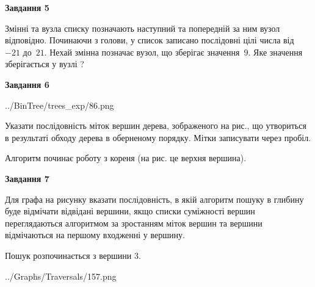 \documentclass[12pt, ukrainian]{article}
\begin{document}
{\begin {large}
{\begin {center}\textbf{Завдання 5}\end {center}}\par
Змінні  та  вузла списку позначають наступний та попередній за ним вузол відповідно. Починаючи з голови, у список записано послідовні цілі числа від~$-21$ до~$21$. Нехай змінна  позначає вузол, що зберігає значення~$9$.
Яке значення зберігається у вузлі  ?\par
\newpage

{\begin {center}\textbf{Завдання 6}\end {center}}\par

\begin{center}
	{../BinTree/trees_exp/86.png}
\end{center}
Указати послідовність міток вершин дерева, зображеного на рис., що утвориться в результаті обходу дерева в оберненому порядку. Мітки записувати через пробіл.\par Алгоритм починає роботу з кореня (на рис. це верхня вершина).\par
\newpage

{\begin {center}\textbf{Завдання 7}\end {center}}\par
Для графа на рисунку вказати послідовність, в якій алгоритм пошуку в глибину буде відмічати відвідані вершини, якщо списки суміжності вершин переглядаються алгоритмом за зростанням міток вершин та вершини відмічаються на першому вход\-женні у вершину.\par
Пошук розпочинається з вершини 3.\par

\begin{center}
	{../Graphs/Traversals/157.png}
\end{center}\par
\newpage


\end{large}}
\end{document}
